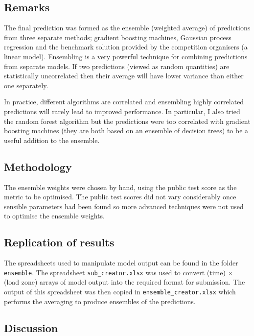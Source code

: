 \label{sec:ensemble}

\subsection{Remarks}

The final prediction was formed as the ensemble (weighted average) of predictions from three separate methods; gradient boosting machines, Gaussian process regression and the benchmark solution provided by the competition organisers (a linear model).
Ensembling is a very powerful technique for combining predictions from separate models.
If two predictions (viewed as random quantities) are statistically uncorrelated then their average will have lower variance than either one separately.

In practice, different algorithms are correlated and ensembling highly correlated predictions will rarely lead to improved performance.
In particular, I also tried the random forest algorithm but the predictions were too correlated with gradient boosting machines (they are both based on an ensemble of decision trees) to be a useful addition to the ensemble.

\subsection{Methodology}

The ensemble weights were chosen by hand, using the public test score as the metric to be optimised.
The public test scores did not vary considerably once sensible parameters had been found so more advanced techniques were not used to optimise the ensemble weights.

\subsection{Replication of results}

The spreadsheets used to manipulate model output can be found in the folder \texttt{ensemble}.
The spreadsheet \texttt{sub\_creator.xlsx} was used to convert (time) $\times$ (load zone) arrays of model output into the required format for submission.
The output of this spreadsheet was then copied in \texttt{ensemble\_creator.xlsx} which performs the averaging to produce ensembles of the predictions.

\subsection{Discussion}

